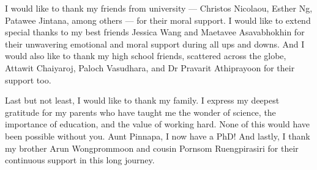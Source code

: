 {  I would like to thank my friends from university --- Christos Nicolaou, Esther Ng, Patawee Jintana, among others --- for their moral support.
  I would like to extend special thanks to my best friends Jessica Wang and Maetavee Asavabhokhin for their unwavering emotional and moral support during all ups and downs.
  And I would also like to thank my high school friends, scattered across the globe, Attawit Chaiyaroj, Paloch Vasudhara, and Dr Pravarit Athiprayoon for their support too.

  Last but not least, I would like to thank my family.
  I express my deepest gratitude for my parents who have taught me the wonder of science, the importance of education, and the value of working hard.
  None of this would have been possible without you.
  Aunt Pinnapa, I now have a PhD\@!
  And lastly, I thank my brother Arun Wongprommoon and cousin Pornsom Ruengpirasiri for their continuous support in this long journey.
}






